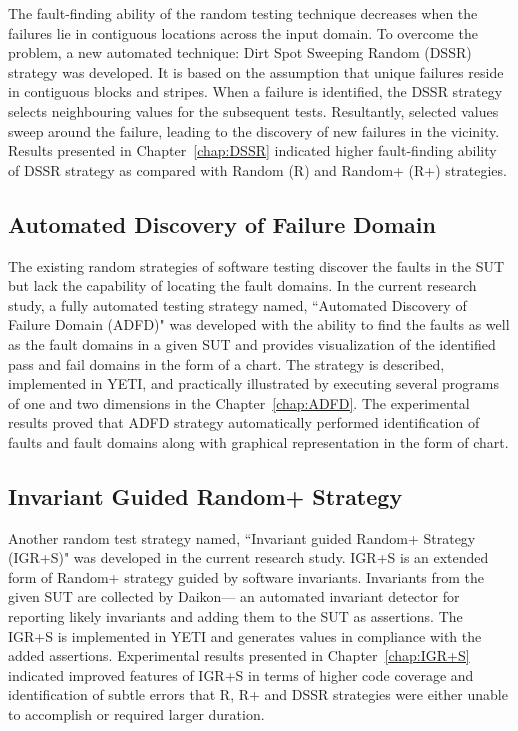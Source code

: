 The fault-finding ability of the random testing technique decreases when the failures lie in contiguous locations across the input domain. To overcome the problem, a new automated technique: Dirt Spot Sweeping Random (DSSR) strategy was developed. It is based on the assumption that unique failures reside in contiguous blocks and stripes. When a failure is identified, the DSSR strategy selects neighbouring values for the subsequent tests. Resultantly, selected values sweep around the failure, leading to the discovery of new failures in the vicinity. Results presented in Chapter~\ref{chap:DSSR} indicated higher fault-finding ability of DSSR strategy as compared with Random (R) and Random+ (R+) strategies.

\subsection{Automated Discovery of Failure Domain}
The existing random strategies of software testing discover the faults in the SUT but lack the capability of locating the fault domains. In the current research study, a fully automated testing strategy named, ``Automated Discovery of Failure Domain (ADFD)" was developed with the ability to find the faults as well as the fault domains in a given SUT and provides visualization of the identified pass and fail domains in the form of a chart. The strategy is described, implemented in YETI, and practically illustrated by executing several programs of one and two dimensions in the Chapter~\ref{chap:ADFD}. The experimental results proved that ADFD strategy automatically performed identification of faults and fault domains along with graphical representation in the form of chart.

\subsection{Invariant Guided Random+ Strategy}
Another random test strategy named, ``Invariant guided Random+ Strategy (IGR+S)" was developed in the current research study. IGR+S is an extended form of Random+ strategy guided by software invariants. Invariants from the given SUT are collected by Daikon--- an automated invariant detector for reporting likely invariants and adding them to the SUT as assertions. The IGR+S is implemented in YETI and generates values in compliance with the added assertions. Experimental results presented in Chapter~\ref{chap:IGR+S} indicated improved features of IGR+S in terms of higher code coverage and identification of subtle errors that R, R+ and DSSR strategies were either unable to accomplish or required larger duration.  

